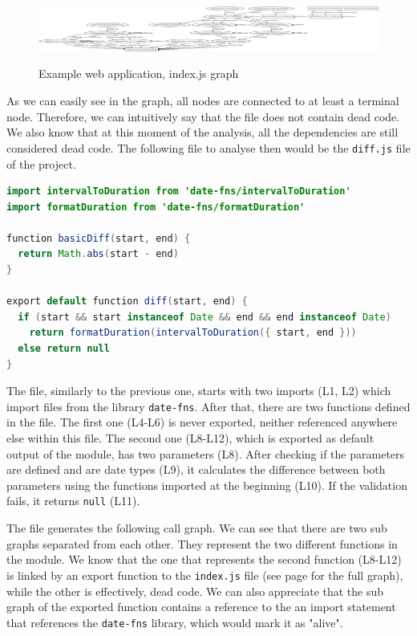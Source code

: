 \documentclass{uvamscse}
\begin{document}
\begin{figure}[H]
  \centering
    \includegraphics[width=\textwidth]{dead-code_graph_index.eps}
    \label{fig:deadcode}
   \caption{Example web application, index.js graph}
\end{figure}

As we can easily see in the graph, all nodes are connected to at least a terminal node. Therefore, we can intuitively say that the file does not contain dead code. We also know that at this moment of the analysis, all the dependencies are still considered dead code. The following file to analyse then would be the \texttt{diff.js} file of the project.

\begin{lstlisting}[language=Java, caption=\texttt{diff.js} file of the example web application]
import intervalToDuration from 'date-fns/intervalToDuration'
import formatDuration from 'date-fns/formatDuration'

function basicDiff(start, end) {
  return Math.abs(start - end)
}

export default function diff(start, end) {
  if (start && start instanceof Date && end && end instanceof Date)
    return formatDuration(intervalToDuration({ start, end }))
  else return null
}
\end{lstlisting}

The file, similarly to the previous one, starts with two imports (L1, L2) which import files from the library \texttt{date-fns}. After that, there are two functions defined in the file. The first one (L4-L6) is never exported, neither referenced anywhere else within this file. The second one (L8-L12), which is exported as default output of the module, has two parameters (L8). After checking if the parameters are defined and are date types (L9), it calculates the difference between both parameters using the functions imported at the beginning (L10). If the validation fails, it returns \texttt{null} (L11).

The file generates the following call graph. We can see that there are two sub graphs separated from each other. They represent the two different functions in the module. We know that the one that represents the second function (L8-L12) is linked by an export function to the \texttt{index.js} file (see page \pageref{fig:deadcode} for the full graph), while the other is effectively, dead code. We can also appreciate that the sub graph of the exported function contains a reference to the an import statement that references the \texttt{date-fns} library, which would mark it as "alive".
\end{document}
